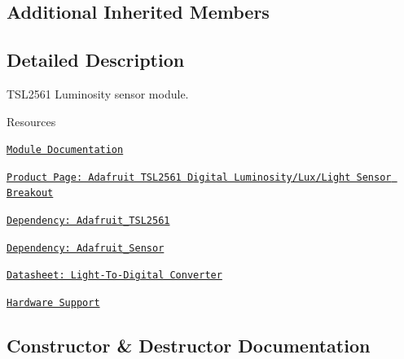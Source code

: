 \subsection*{Additional Inherited Members}


\subsection{Detailed Description}
T\+S\+L2561 Luminosity sensor module. 

\begin{DoxyParagraph}{Resources}

\begin{DoxyItemize}
\item \href{https://openslab-osu.github.io/Loom/html/class_loom___t_s_l2561.html}{\tt Module Documentation}
\item \href{https://www.adafruit.com/product/439}{\tt Product Page\+: Adafruit T\+S\+L2561 Digital Luminosity/\+Lux/\+Light Sensor Breakout}
\item \href{https://github.com/adafruit/Adafruit_TSL2561}{\tt Dependency\+: Adafruit\+\_\+\+T\+S\+L2561}
\item \href{https://github.com/adafruit/Adafruit_Sensor}{\tt Dependency\+: Adafruit\+\_\+\+Sensor}
\item \href{https://cdn-shop.adafruit.com/datasheets/TSL2561.pdf}{\tt Datasheet\+: Light-\/\+To-\/\+Digital Converter}
\item \href{https://github.com/OPEnSLab-OSU/Loom/wiki/Hardware-Support#tsl2561-luminosity-sensor}{\tt Hardware Support} 
\end{DoxyItemize}
\end{DoxyParagraph}


\subsection{Constructor \& Destructor Documentation}
